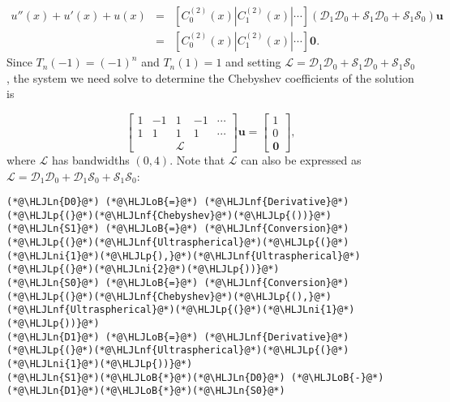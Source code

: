 \documentclass[12pt,a4paper]{article}
\newcommand{\HLJLn}[1]{#1}
\newcommand{\HLJLnf}[1]{\textcolor[RGB]{66,102,213}{#1}}
\newcommand{\HLJLni}[1]{\textcolor[RGB]{59,151,46}{#1}}
\newcommand{\HLJLoB}[1]{\textcolor[RGB]{102,102,102}{\textbf{#1}}}
\newcommand{\HLJLp}[1]{#1}
\begin{document}
\begin{eqnarray*}
u''(x) + u'(x)  + u(x)  &=& \left[ C_0^{(2)}(x) | C_1^{(2)}(x) | \cdots \right]\left(\mathcal{D}_1\mathcal{D}_0  + \mathcal{S}_1\mathcal{D}_0 + \mathcal{S}_1\mathcal{S}_0  \right) \mathbf{u} \\
 &=& \left[ C_0^{(2)}(x) | C_1^{(2)}(x) | \cdots \right]\mathbf{0}.
 \end{eqnarray*}
Since $T_n(-1) = (-1)^n$ and $T_n(1) = 1$ and setting $\mathcal{L} = \mathcal{D}_1\mathcal{D}_0  + \mathcal{S}_1\mathcal{D}_0 + \mathcal{S}_1\mathcal{S}_0$, the system we need solve to determine the Chebyshev coefficients of the solution is

\[
\begin{bmatrix}
1 & -1 &  1 & -1 & \cdots  \\
1 & 1  &  1 & 1  & \cdots \\
& &\mathcal{L} & &
\end{bmatrix}\mathbf{u} = \begin{bmatrix} 1  \\
0 \\
\mathbf{0}
\end{bmatrix},
\]
where $\mathcal{L}$ has bandwidths $(0,4)$. Note that $\mathcal{L}$ can also be expressed as $\mathcal{L} = \mathcal{D}_1\mathcal{D}_0  + \mathcal{D}_1\mathcal{S}_0 + \mathcal{S}_1\mathcal{S}_0$:


\begin{lstlisting}
(*@\HLJLn{D0}@*) (*@\HLJLoB{=}@*) (*@\HLJLnf{Derivative}@*)(*@\HLJLp{(}@*)(*@\HLJLnf{Chebyshev}@*)(*@\HLJLp{())}@*)
(*@\HLJLn{S1}@*) (*@\HLJLoB{=}@*) (*@\HLJLnf{Conversion}@*)(*@\HLJLp{(}@*)(*@\HLJLnf{Ultraspherical}@*)(*@\HLJLp{(}@*)(*@\HLJLni{1}@*)(*@\HLJLp{),}@*)(*@\HLJLnf{Ultraspherical}@*)(*@\HLJLp{(}@*)(*@\HLJLni{2}@*)(*@\HLJLp{))}@*)
(*@\HLJLn{S0}@*) (*@\HLJLoB{=}@*) (*@\HLJLnf{Conversion}@*)(*@\HLJLp{(}@*)(*@\HLJLnf{Chebyshev}@*)(*@\HLJLp{(),}@*)(*@\HLJLnf{Ultraspherical}@*)(*@\HLJLp{(}@*)(*@\HLJLni{1}@*)(*@\HLJLp{))}@*)
(*@\HLJLn{D1}@*) (*@\HLJLoB{=}@*) (*@\HLJLnf{Derivative}@*)(*@\HLJLp{(}@*)(*@\HLJLnf{Ultraspherical}@*)(*@\HLJLp{(}@*)(*@\HLJLni{1}@*)(*@\HLJLp{))}@*)
(*@\HLJLn{S1}@*)(*@\HLJLoB{*}@*)(*@\HLJLn{D0}@*) (*@\HLJLoB{-}@*) (*@\HLJLn{D1}@*)(*@\HLJLoB{*}@*)(*@\HLJLn{S0}@*)
\end{lstlisting}
\end{document}
